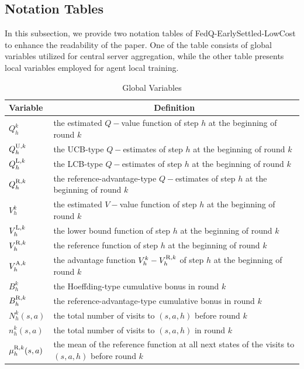 \documentclass{article}
\newcommand{\U}{\textnormal{U}}
\newcommand{\LL}{\textnormal{L}}
\newcommand{\R}{\textnormal{R}}
\newcommand{\A}{\textnormal{A}}
\begin{document}
\subsection{Notation Tables}
\label{notation}
In this subsection, we provide two notation tables of FedQ-EarlySettled-LowCost to enhance the readability of the paper. One of the table consists of global variables utilized for central server aggregation, while the other table presents local variables employed for agent local training.
\begin{table}[ht]
\caption{Global Variables}
\vspace{0.5em}
\renewcommand{\arraystretch}{1.27}
\begin{tabular}{|>{\centering\arraybackslash}m{1.5cm}|m{11.5cm}|}
\hline
Variable&  \multicolumn{1}{c|}{Definition} \\ \hline
$Q_h^k$ & the estimated $Q-$value function of step $h$ at the beginning of round $k$ \\ \hline
$Q_h^{\U, k}$ & the UCB-type $Q-$estimates of step $h$ at the beginning of round $k$ \\ \hline
$Q_h^{\LL, k}$ & the LCB-type $Q-$estimates of step $h$ at the beginning of round $k$ \\ \hline
$Q_h^{\R, k}$ & the reference-advantage-type $Q-$estimates of step $h$ at the beginning of round $k$ \\ \hline
$V_h^k$ & the estimated $V-$value function of step $h$ at the beginning of round $k$ \\ \hline
$V_h^{\LL,k}$ & the lower bound function of step $h$ at the beginning of round $k$ \\ \hline
$V_h^{\R,k}$ & the reference function of step $h$ at the beginning of round $k$ \\ \hline
$V_h^{\A,k}$ & the advantage function $V_h^k - V_h^{\R,k}$ of step $h$ at the beginning of round $k$ \\ \hline
$B_h^{k}$ & the Hoeffding-type cumulative bonus in round $k$ \\ \hline
$B_h^{\R,k}$ & the reference-advantage-type cumulative bonus in round $k$ \\ \hline
$N_h^k(s,a)$ & the total number of visits to $(s,a,h)$ before round $k$ \\ \hline
$n_h^k(s,a)$ & the total number of visits to $(s,a,h)$ in round $k$ \\ \hline
$\mu_h^{\R,k}(s,a)$ &  the mean of the reference function at all next states of the visits to $(s,a,h)$ before round $k$\\ \hline

\end{tabular}
\end{table}
\end{document}
